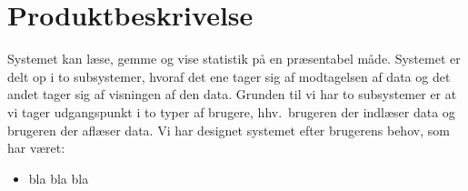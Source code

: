 \section{Produktbeskrivelse}
Systemet kan læse, gemme og vise statistik på en præsentabel måde. Systemet er delt op i to subsystemer, hvoraf det ene tager sig af modtagelsen af data og det andet tager sig af visningen af den data.
Grunden til vi har to subsystemer er at vi tager udgangspunkt i to typer af brugere, 
hhv.\ brugeren der indlæser data og brugeren der aflæser data.
Vi har designet systemet efter brugerens behov, som har været:
\begin{itemize}
    \item bla bla bla
\end{itemize}
